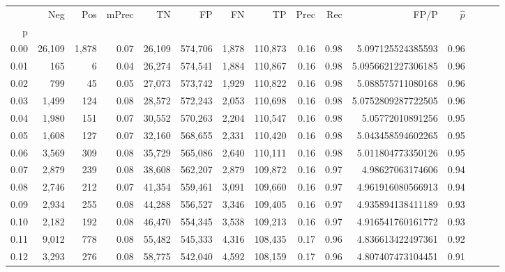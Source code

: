 \begin{tabular}{rrrrrrrrrrrrrrr}
\toprule
{} &     Neg &    Pos & mPrec &       TN &       FP &       FN &       TP &  Prec &   Rec &                  FP/P & $\hat{p}$ \\
p    &         &        &       &          &          &          &          &       &       &                       &           \\
\midrule
0.00 &  26,109 &  1,878 &  0.07 &   26,109 &  574,706 &    1,878 &  110,873 &  0.16 &  0.98 &     5.097125524385593 &      0.96 \\
0.01 &     165 &      6 &  0.04 &   26,274 &  574,541 &    1,884 &  110,867 &  0.16 &  0.98 &    5.0956621227306185 &      0.96 \\
0.02 &     799 &     45 &  0.05 &   27,073 &  573,742 &    1,929 &  110,822 &  0.16 &  0.98 &     5.088575711080168 &      0.96 \\
0.03 &   1,499 &    124 &  0.08 &   28,572 &  572,243 &    2,053 &  110,698 &  0.16 &  0.98 &    5.0752809287722505 &      0.96 \\
0.04 &   1,980 &    151 &  0.07 &   30,552 &  570,263 &    2,204 &  110,547 &  0.16 &  0.98 &      5.05772010891256 &      0.95 \\
0.05 &   1,608 &    127 &  0.07 &   32,160 &  568,655 &    2,331 &  110,420 &  0.16 &  0.98 &     5.043458594602265 &      0.95 \\
0.06 &   3,569 &    309 &  0.08 &   35,729 &  565,086 &    2,640 &  110,111 &  0.16 &  0.98 &     5.011804773350126 &      0.95 \\
0.07 &   2,879 &    239 &  0.08 &   38,608 &  562,207 &    2,879 &  109,872 &  0.16 &  0.97 &      4.98627063174606 &      0.94 \\
0.08 &   2,746 &    212 &  0.07 &   41,354 &  559,461 &    3,091 &  109,660 &  0.16 &  0.97 &     4.961916080566913 &      0.94 \\
0.09 &   2,934 &    255 &  0.08 &   44,288 &  556,527 &    3,346 &  109,405 &  0.16 &  0.97 &     4.935894138411189 &      0.93 \\
0.10 &   2,182 &    192 &  0.08 &   46,470 &  554,345 &    3,538 &  109,213 &  0.16 &  0.97 &     4.916541760161772 &      0.93 \\
0.11 &   9,012 &    778 &  0.08 &   55,482 &  545,333 &    4,316 &  108,435 &  0.17 &  0.96 &     4.836613422497361 &      0.92 \\
0.12 &   3,293 &    276 &  0.08 &   58,775 &  542,040 &    4,592 &  108,159 &  0.17 &  0.96 &     4.807407473104451 &      0.91 \\

\end{tabular}
